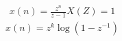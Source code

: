 \begin{align}\label{11027_eq1}
    x(n) = \frac{z^n}{z-1}
    X(Z) = 1    
\end{align}
\begin{align}\label{11027_eq2}
    x(n) = z^k \log{(1-z^{-1})}    
\end{align}
